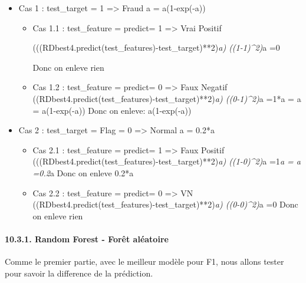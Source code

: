 \documentclass[11pt]{article}
\begin{document}
\begin{itemize}
\item
  Cas 1 : test\_target = 1 =\textgreater{} Fraud a = a(1-exp(-a))

  \begin{itemize}
  \item
    Cas 1.1 : test\_feature = predict= 1 =\textgreater{} Vrai Positif

    (((RDbest4.predict(test\_features)-test\_target)**2)\emph{a)
    ((1-1)\^{}2)}a =0

    Donc on enleve rien
  \item
    Cas 1.2 : test\_feature = predict= 0 =\textgreater{} Faux Negatif
    ((RDbest4.predict(test\_features)-test\_target)**2)\emph{a)
    ((0-1)\^{}2)}a =1*a = a = a(1-exp(-a)) Donc on enleve: a(1-exp(-a))
  \end{itemize}
\item
  Cas 2 : test\_target = Flag = 0 =\textgreater{} Normal a = 0.2*a

  \begin{itemize}
  \item
    Cas 2.1 : test\_feature = predict= 1 =\textgreater{} Faux Positif
    (((RDbest4.predict(test\_features)-test\_target)**2)\emph{a)
    ((1-0)\^{}2)}a =1\emph{a = a =0.2}a Donc on enleve 0.2*a
  \item
    Cas 2.2 : test\_feature = predict= 0 =\textgreater{} VN
    ((RDbest4.predict(test\_features)-test\_target)**2)\emph{a)
    ((0-0)\^{}2)}a =0 Donc on enleve rien
  \end{itemize}
\end{itemize}

    \hypertarget{random-forest---foruxeat-aluxe9atoire}{%
\paragraph{10.3.1. Random Forest - Forêt
aléatoire}\label{random-forest---foruxeat-aluxe9atoire}}

    Comme le premier partie, avec le meilleur modèle pour F1, nous allons
tester pour savoir la difference de la prédiction.
\end{document}
